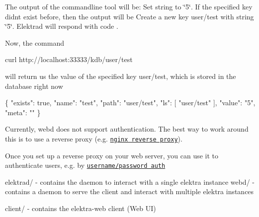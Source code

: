 The output of the commandline tool will be\+: {\ttfamily Set string to \char`\"{}5\char`\"{}}. If the specified key didn\textquotesingle{}t exist before, then the output will be {\ttfamily Create a new key user/test with string \char`\"{}5\char`\"{}}. Elektrad will respond with code {}.

Now, the command


\begin{DoxyCode}
curl http://localhost:33333/kdb/user/test
\end{DoxyCode}


will return us the value of the specified key {\ttfamily user/test}, which is stored in the database right now


\begin{DoxyCode}
\{
    "exists": true,
    "name": "test",
    "path": "user/test",
    "ls": [
        "user/test"
    ],
    "value": "5",
    "meta": ""
\}
\end{DoxyCode}


Currently, webd does not support authentication. The best way to work around this is to use a reverse proxy (e.\+g. \href{https://www.nginx.com/resources/admin-guide/reverse-proxy/}{\tt nginx reverse proxy}).

Once you set up a reverse proxy on your web server, you can use it to authenticate users, e.\+g. by \href{https://www.digitalocean.com/community/tutorials/how-to-set-up-password-authentication-with-nginx-on-ubuntu-14-04}{\tt username/password auth}

{\ttfamily elektrad/} -\/ contains the daemon to interact with a single elektra instance {\ttfamily webd/} -\/ contains a daemon to serve the client and interact with multiple elektra instances

{\ttfamily client/} -\/ contains the elektra-\/web client (Web UI)


